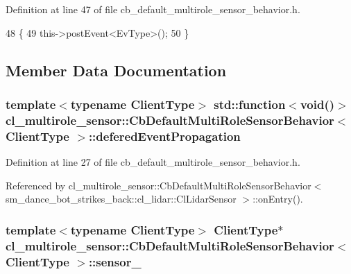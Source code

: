 Definition at line 47 of file cb\+\_\+default\+\_\+multirole\+\_\+sensor\+\_\+behavior.\+h.


\begin{DoxyCode}
48   \{
49     this->postEvent<EvType>();
50   \}
\end{DoxyCode}


\subsection{Member Data Documentation}
\subsubsection[{\texorpdfstring{defered\+Event\+Propagation}{deferedEventPropagation}}]{\setlength{\rightskip}{0pt plus 5cm}template$<$typename Client\+Type$>$ std\+::function$<$void()$>$ {\bf cl\+\_\+multirole\+\_\+sensor\+::\+Cb\+Default\+Multi\+Role\+Sensor\+Behavior}$<$ Client\+Type $>$\+::defered\+Event\+Propagation}\hypertarget{classcl__multirole__sensor_1_1CbDefaultMultiRoleSensorBehavior_a18f86fd2fd9c3575b62a2c58953b7d33}{}\label{classcl__multirole__sensor_1_1CbDefaultMultiRoleSensorBehavior_a18f86fd2fd9c3575b62a2c58953b7d33}


Definition at line 27 of file cb\+\_\+default\+\_\+multirole\+\_\+sensor\+\_\+behavior.\+h.



Referenced by cl\+\_\+multirole\+\_\+sensor\+::\+Cb\+Default\+Multi\+Role\+Sensor\+Behavior$<$ sm\+\_\+dance\+\_\+bot\+\_\+strikes\+\_\+back\+::cl\+\_\+lidar\+::\+Cl\+Lidar\+Sensor $>$\+::on\+Entry().

\subsubsection[{\texorpdfstring{sensor\+\_\+}{sensor_}}]{\setlength{\rightskip}{0pt plus 5cm}template$<$typename Client\+Type$>$ Client\+Type$\ast$ {\bf cl\+\_\+multirole\+\_\+sensor\+::\+Cb\+Default\+Multi\+Role\+Sensor\+Behavior}$<$ Client\+Type $>$\+::sensor\+\_\+}\hypertarget{classcl__multirole__sensor_1_1CbDefaultMultiRoleSensorBehavior_a201893c3c859259eac3166405f3509cb}{}\label{classcl__multirole__sensor_1_1CbDefaultMultiRoleSensorBehavior_a201893c3c859259eac3166405f3509cb}



